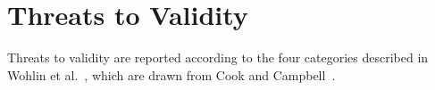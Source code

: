 \documentclass[smallcondensed]{svjour3}
\newcommand{\bi}{\begin{itemize}}%
\newcommand{\ei}{\end{itemize}}
\newcommand{\fig}[1]{Figure~\ref{fig:#1}}
\def\baselinestretch{1}
\begin{document}
 
%
 



 



 


\section{Threats to Validity}

Threats to validity are reported according to the four categories described in Wohlin et al.~\cite{wohlin2012}, which are drawn from Cook and Campbell~\cite{cook1979}. 
\end{document}

